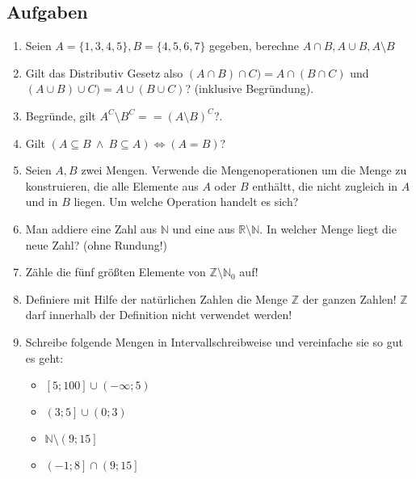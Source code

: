 \subsection{Aufgaben}
\begin{enumerate}
	\item Seien $A = \{1,3,4,5\}, B = \{4, 5, 6, 7\}$ gegeben, berechne $A \cap B, A \cup B, A \setminus B$
	\item Gilt das Distributiv Gesetz also $(A \cap B) \cap C) = A \cap (B \cap C)$ und $(A \cup B) \cup C) = A \cup (B \cup C)$? (inklusive Begründung).
	\item Begründe, gilt $A^C \setminus B^C == (A \setminus B)^C$?.
	\item Gilt $(A \subseteq B \ \land \ B \subseteq A) \iff (A = B)$?
	\item Seien $A, B$ zwei Mengen. Verwende die Mengenoperationen um die Menge zu konstruieren, die alle Elemente aus $A$ oder $B$ enthältt, die nicht zugleich in $A$ und in $B$ liegen. Um welche Operation handelt es sich?
	\item Man addiere eine Zahl aus $\mathbb N$ und eine aus $\mathbb R \setminus \mathbb N$. In welcher Menge liegt die neue Zahl? (ohne Rundung!)
	\item Zähle die fünf größten Elemente von $\mathbb Z \setminus \mathbb N_0$ auf!
	\item Definiere mit Hilfe der natürlichen Zahlen die Menge $\mathbb{Z}$ der ganzen Zahlen! $\mathbb Z$ darf innerhalb der Definition nicht verwendet werden!
	\item Schreibe folgende Mengen in Intervallschreibweise und vereinfache sie so gut es geht:
\begin{itemize}
	\item $\left[5;100\right] \cup \left(- \infty; 5\right)$
	\item $\left(3;5\right] \cup \left(0; 3\right)$
	\item $\mathbb{N} \setminus \left(9;15\right]$
	\item $\left(-1;8\right] \cap \left(9;15\right]$
\end{itemize}	

\end{enumerate}
